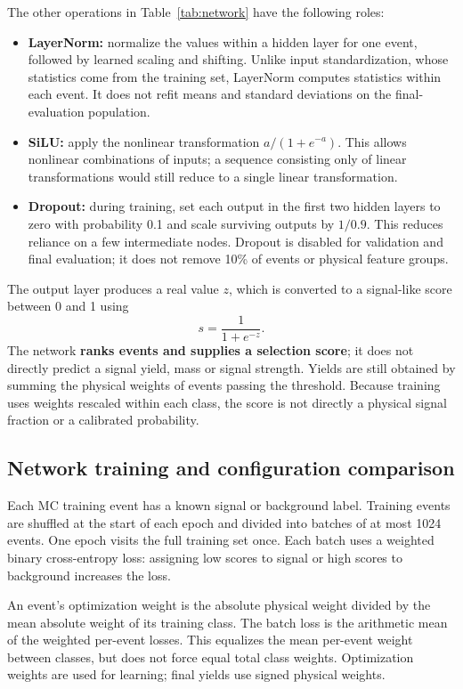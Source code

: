 \documentclass[11pt,a4paper]{article}
\begin{document}
The other operations in Table~\ref{tab:network} have the following roles:
\begin{itemize}
\item \textbf{LayerNorm:} normalize the values within a hidden layer for one event, followed by learned scaling and shifting.
Unlike input standardization, whose statistics come from the training set, LayerNorm computes statistics within each event. It does not refit means and standard deviations on the final-evaluation population.
\item \textbf{SiLU:} apply the nonlinear transformation $a/(1+e^{-a})$.
This allows nonlinear combinations of inputs; a sequence consisting only of linear transformations would still reduce to a single linear transformation.
\item \textbf{Dropout:} during training, set each output in the first two hidden layers to zero with probability 0.1 and scale surviving outputs by $1/0.9$.
This reduces reliance on a few intermediate nodes. Dropout is disabled for validation and final evaluation; it does not remove 10\% of events or physical feature groups.
\end{itemize}
The output layer produces a real value $z$, which is converted to a signal-like score between 0 and 1 using
\[
 s=\frac{1}{1+e^{-z}}.
\]
The network \textbf{ranks events and supplies a selection score}; it does not directly predict a signal yield, mass or signal strength.
Yields are still obtained by summing the physical weights of events passing the threshold.
Because training uses weights rescaled within each class, the score is not directly a physical signal fraction or a calibrated probability.

\subsection{Network training and configuration comparison}
Each MC training event has a known signal or background label.
Training events are shuffled at the start of each epoch and divided into batches of at most 1024 events. One epoch visits the full training set once.
Each batch uses a weighted binary cross-entropy loss: assigning low scores to signal or high scores to background increases the loss.

An event's optimization weight is the absolute physical weight divided by the mean absolute weight of its training class.
The batch loss is the arithmetic mean of the weighted per-event losses.
This equalizes the mean per-event weight between classes, but does not force equal total class weights.
Optimization weights are used for learning; final yields use signed physical weights.
\end{document}

